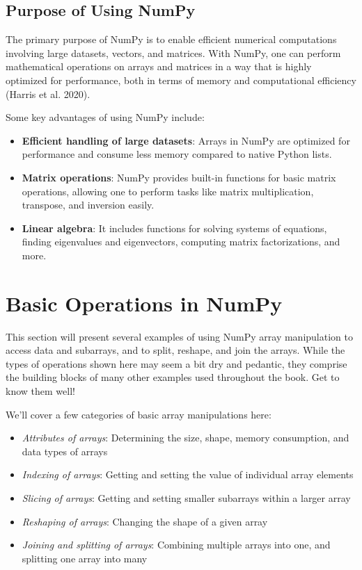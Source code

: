 \documentclass[
  letterpaper,
  DIV=11,
  numbers=noendperiod]{scrreprt}
\providecommand{\tightlist}{%
  \setlength{\itemsep}{0pt}\setlength{\parskip}{0pt}}\usepackage{longtable,booktabs,array}
\theoremstyle{plain}
\theoremstyle{definition}
\theoremstyle{remark}
\begin{document}
\subsection{Purpose of Using NumPy}\label{purpose-of-using-numpy}

The primary purpose of NumPy is to enable efficient numerical
computations involving large datasets, vectors, and matrices. With
NumPy, one can perform mathematical operations on arrays and matrices in
a way that is highly optimized for performance, both in terms of memory
and computational efficiency (Harris et al. 2020).

Some key advantages of using NumPy include:

\begin{itemize}
\tightlist
\item
  \textbf{Efficient handling of large datasets}: Arrays in NumPy are
  optimized for performance and consume less memory compared to native
  Python lists.
\item
  \textbf{Matrix operations}: NumPy provides built-in functions for
  basic matrix operations, allowing one to perform tasks like matrix
  multiplication, transpose, and inversion easily.
\item
  \textbf{Linear algebra}: It includes functions for solving systems of
  equations, finding eigenvalues and eigenvectors, computing matrix
  factorizations, and more.
\end{itemize}

\section{Basic Operations in NumPy}\label{basic-operations-in-numpy}

This section will present several examples of using NumPy array
manipulation to access data and subarrays, and to split, reshape, and
join the arrays. While the types of operations shown here may seem a bit
dry and pedantic, they comprise the building blocks of many other
examples used throughout the book. Get to know them well!

We'll cover a few categories of basic array manipulations here:

\begin{itemize}
\tightlist
\item
  \emph{Attributes of arrays}: Determining the size, shape, memory
  consumption, and data types of arrays
\item
  \emph{Indexing of arrays}: Getting and setting the value of individual
  array elements
\item
  \emph{Slicing of arrays}: Getting and setting smaller subarrays within
  a larger array
\item
  \emph{Reshaping of arrays}: Changing the shape of a given array
\item
  \emph{Joining and splitting of arrays}: Combining multiple arrays into
  one, and splitting one array into many
\end{itemize}
\end{document}

